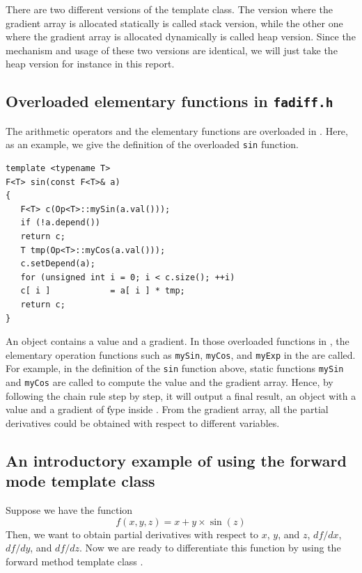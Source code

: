 There are two different versions of the \F template class. The version where the gradient array is allocated statically is called stack version, while the other one where the gradient array is allocated dynamically is called heap version. Since the mechanism and usage of these two versions are identical, we will just take the heap version for instance in this report.
\subsection{Overloaded elementary functions in \textbf\texttt{fadiff.h}}
The arithmetic operators and the elementary functions are overloaded in \fadiff. Here, as an example, we give the definition of the overloaded \texttt{sin} function.


\begin{lstlisting}[numbers=none]
template <typename T>
F<T> sin(const F<T>& a)
{
   F<T> c(Op<T>::mySin(a.val()));
   if (!a.depend())
   return c;
   T tmp(Op<T>::myCos(a.val()));
   c.setDepend(a);
   for (unsigned int i = 0; i < c.size(); ++i)
   c[ i ]            = a[ i ] * tmp;
   return c;
}
\end{lstlisting}

An \F object contains a value and a gradient. In those overloaded functions in \fadiff, the elementary operation functions such as \texttt{mySin},  \texttt{myCos}, and \texttt{myExp} in the \fadbad are called. For example, in the definition of the \texttt{sin} function above, static functions \texttt{mySin} and \texttt{myCos} are called to compute the value and the gradient array. Hence, by following the chain rule step by step, it will output a final result, an \F object with a value and a gradient of \U type inside \cite{IntroAD}. From the gradient array, all the partial derivatives could be obtained with respect to different variables.

\subsection{An introductory example of using the forward mode template class}
Suppose we have the function
\begin{equation}
f(x,y,z)=x+y\times\sin(z)
\label{eq:1}
\end{equation}
Then, we want to obtain partial derivatives with respect to $x$, $y$, and $z$, $df/dx$, $df/dy$, and $df/dz$. Now we are ready to differentiate this function by using the forward method template class \Fn.

